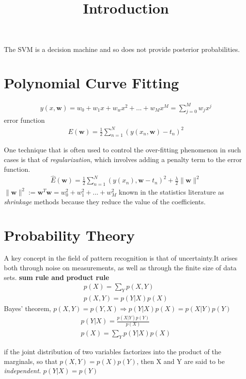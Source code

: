 \documentclass[a4paper]{article}
\begin{document}
\title{Introduction}
\author{}
\maketitle

The SVM is a decision machine and so does not provide posterior probabilities.
\section{Polynomial Curve Fitting}

\begin{align}
y(x, \mathbf{w}) = w_0+w_1x+w_wx^2+...+w_Mx^M = \sum_{j=0}^M w_jx^j
\end{align}
error function
\begin{align}
E(\mathbf{w}) = \frac{1}{2} \sum_{n=1}^N (y(x_n,\mathbf{w})-t_n)^2
\end{align}

One technique that is often used to control the over-fitting
phenomenon in such cases is that of \textit{regularization}, which involves adding a penalty term to the error function.
\begin{align}
\widehat{E}(\mathbf{w}) = \frac{1}{2} \sum_{n=1}^N
  (y(x_n),\mathbf{w}-t_n)^2 + \frac{\lambda}{2} \|\mathbf{w}\|^2
\end{align}
$ \|\mathbf{w}\|^2 := \mathbf{w}^T\mathbf{w} = w_0^2+w_1^2+...+w_M^2 $
known in the statistics literature as \textit{shrinkage} methods
because they reduce the value of the coefficients.

\section{Probability Theory}
A key concept in the field of pattern recognition is that of
uncertainty.It arises both through noise on measurements, as well as through the finite size of data sets.
\textbf{sum rule and product rule}
\begin{align*}
p(X) = \sum_Y p(X,Y)\\
p(X,Y) = p(Y|X) p(X)
\end{align*}
Bayes' theorem, $p(X,Y) = p(Y,X) \Rightarrow p(Y|X) p(X) = p(X|Y)p(Y)$
\begin{align*}
p(Y|X) = \frac{p(X|Y)p(Y)}{p(X)}\\
p(X) = \sum_Y p(Y|X) p(X)
\end{align*}

if the joint distribution of two variables factorizes into the product
of the marginals, so that $p(X, Y) = p(X)p(Y)$, then X and Y are said
to be \textit{independent}. $p(Y |X) = p(Y)$
\end{document}
